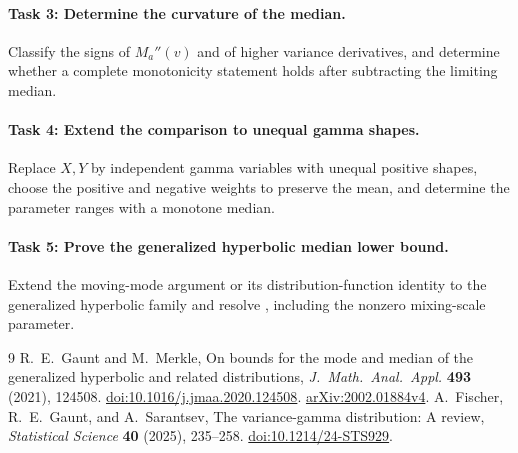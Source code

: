 \documentclass[11pt]{article}
\begin{document}
\paragraph{Task 3: Determine the curvature of the median.}
Classify the signs of \(M_a''(v)\) and of higher variance derivatives,
and determine whether a complete monotonicity statement holds after
subtracting the limiting median.

\paragraph{Task 4: Extend the comparison to unequal gamma shapes.}
Replace \(X,Y\) by independent gamma variables with unequal positive
shapes, choose the positive and negative weights to preserve the mean,
and determine the parameter ranges with a monotone median.

\paragraph{Task 5: Prove the generalized hyperbolic median lower bound.}
Extend the moving-mode argument or its distribution-function identity
to the generalized hyperbolic family and resolve
\cite[Conjecture 3.7]{GM}, including the nonzero mixing-scale parameter.

\begin{thebibliography}{9}
R.\ E.\ Gaunt and M.\ Merkle,
On bounds for the mode and median of the generalized hyperbolic and
related distributions,
\emph{J.\ Math.\ Anal.\ Appl.} \textbf{493} (2021), 124508.
\href{https://doi.org/10.1016/j.jmaa.2020.124508}{doi:10.1016/j.jmaa.2020.124508}.
\href{https://arxiv.org/abs/2002.01884}{arXiv:2002.01884v4}.
A.\ Fischer, R.\ E.\ Gaunt, and A.\ Sarantsev,
The variance-gamma distribution: A review,
\emph{Statistical Science} \textbf{40} (2025), 235--258.
\href{https://doi.org/10.1214/24-STS929}{doi:10.1214/24-STS929}.
\end{thebibliography}
\end{document}
